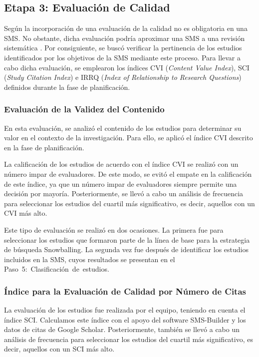 %
\subsection{Etapa 3: Evaluación de Calidad}
Según \cite{Ali-01} la incorporación de una evaluación de la calidad no es obligatoria en una SMS. No obstante, dicha evaluación podría aproximar una SMS a una revisión sistemática \cite{Petersen-01}. Por consiguiente, se buscó verificar la pertinencia de los estudios identificados por los objetivos de la SMS mediante este proceso. Para llevar a cabo dicha evaluación, se emplearon los índices CVI (\textit{Content Value Index}), SCI (\textit{Study Citation Index}) e IRRQ (\textit{Index of Relationship to Research Questions}) definidos durante la fase de planificación.

\subsubsection{Evaluación de la Validez del Contenido}
En esta evaluación, se analizó el contenido de los estudios para determinar su valor en el contexto de la investigación. Para ello, se aplicó el índice CVI descrito en la fase de planificación.

La calificación de los estudios de acuerdo con el índice CVI se realizó con un número impar de evaluadores. De este modo, se evitó el empate en la calificación de este índice, ya que un número impar de evaluadores siempre permite una decisión por mayoría. Posteriormente, se llevó a cabo un análisis de frecuencia para seleccionar los estudios del cuartil más significativo, es decir, aquellos con un CVI más alto.

Este tipo de evaluación se realizó en dos ocasiones. La primera fue para seleccionar los estudios que formaron parte de la línea de base para la estrategia de búsqueda Snowballing. La segunda vez fue después de identificar los \totalEtapaDos{} estudios incluidos en la SMS, cuyos resultados se presentan en el \hbox{Paso 5: Clasificación de estudios.}


\subsubsection{Índice para la Evaluación de Calidad por Número de Citas}
La evaluación de los estudios fue realizada por el equipo, teniendo en cuenta el índice SCI. Calculamos este índice con el apoyo del software SMS-Builder \cite{sms-builder-repo} y los datos de citas de Google Scholar. Posteriormente, también se llevó a cabo un análisis de frecuencia para seleccionar los estudios del cuartil más significativo, es decir, aquellos con un SCI más alto.


